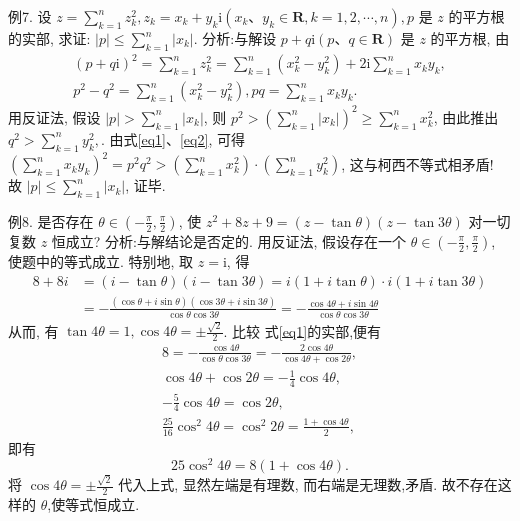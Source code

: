 例7. 设 $z=\sum_{k=1}^n z_k^2, z_k=x_k+y_k \mathrm{i}\left(x_k 、 y_k \in \mathbf{R}, k=1,2, \cdots, n\right), p$ 是 $z$ 的平方根的实部, 求证: $|p| \leqslant \sum_{k=1}^n\left|x_k\right|$.
分析:与解设 $p+q \mathrm{i}(p 、 q \in \mathbf{R})$ 是 $z$ 的平方根, 由
$$
\begin{gathered}
(p+q \mathrm{i})^2=\sum_{k=1}^n z_k^2=\sum_{k=1}^n\left(x_k^2-y_k^2\right)+2 \mathrm{i} \sum_{k=1}^n x_k y_k, \\
p^2-q^2=\sum_{k=1}^n\left(x_k^2-y_k^2\right), p q=\sum_{k=1}^n x_k y_k . \label{eq1}
\end{gathered}
$$
用反证法, 假设 $|p|>\sum_{k=1}^n\left|x_k\right|$, 则 $p^2>\left(\sum_{k=1}^n\left|x_k\right|\right)^2 \geqslant \sum_{k=1}^n x_k^2$, 由此推出 $q^2>\sum_{k=1}^n y_k^2, \label{eq2}$.
由式\ref{eq1}、\ref{eq2}, 可得 $\left(\sum_{k=1}^n x_k y_k\right)^2=p^2 q^2>\left(\sum_{k=1}^n x_k^2\right) \cdot\left(\sum_{k=1}^n y_k^2\right)$, 这与柯西不等式相矛盾!
故 $|p| \leqslant \sum_{k=1}^n\left|x_k\right|$, 证毕.



例8. 是否存在 $\theta \in\left(-\frac{\pi}{2}, \frac{\pi}{2}\right)$, 使 $z^2+8 z+9=(z-\tan \theta)(z-\tan 3 \theta)$ 对一切复数 $z$ 恒成立?
分析:与解结论是否定的.
用反证法, 假设存在一个 $\theta \in\left(-\frac{\pi}{2}, \frac{\pi}{2}\right)$, 使题中的等式成立.
特别地, 取 $z=\mathrm{i}$, 得
$$
\begin{aligned}
8+8 i & =(i-\tan \theta)(i-\tan 3 \theta)=i(1+i \tan \theta) \cdot i(1+i \tan 3 \theta) \\
& =-\frac{(\cos \theta+i \sin \theta)(\cos 3 \theta+i \sin 3 \theta)}{\cos \theta \cos 3 \theta}=-\frac{\cos 4 \theta+i \sin 4 \theta}{\cos \theta \cos 3 \theta}
\end{aligned} \label{eq1}
$$
从而, 有 $\tan 4 \theta=1, \cos 4 \theta= \pm \frac{\sqrt{2}}{2}$.
比较 式\ref{eq1}的实部,便有
$$
\begin{gathered}
8=-\frac{\cos 4 \theta}{\cos \theta \cos 3 \theta}=-\frac{2 \cos 4 \theta}{\cos 4 \theta+\cos 2 \theta}, \\
\cos 4 \theta+\cos 2 \theta=-\frac{1}{4} \cos 4 \theta, \\
-\frac{5}{4} \cos 4 \theta=\cos 2 \theta, \\
\frac{25}{16} \cos ^2 4 \theta=\cos ^2 2 \theta=\frac{1+\cos 4 \theta}{2},
\end{gathered}
$$
即有
$$
25 \cos ^2 4 \theta=8(1+\cos 4 \theta) .
$$
将 $\cos 4 \theta= \pm \frac{\sqrt{2}}{2}$ 代入上式, 显然左端是有理数, 而右端是无理数,矛盾.
故不存在这样的 $\theta$,使等式恒成立.


